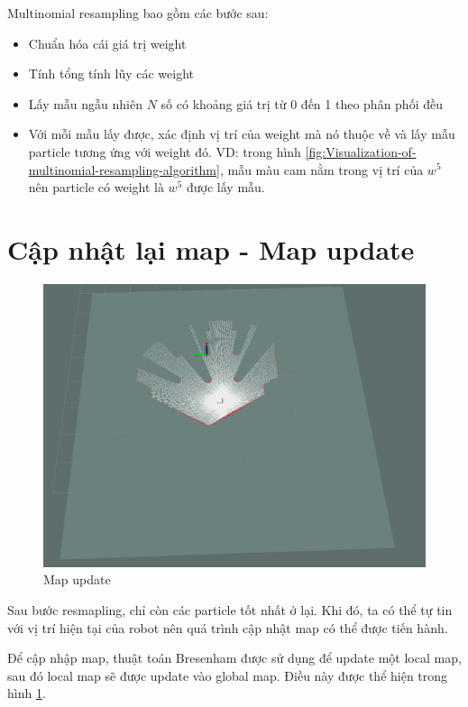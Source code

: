 \documentclass[../../main.tex]{subfiles}
\begin{document}
Multinomial resampling bao gồm các bước sau:
\begin{itemize}
    \item Chuẩn hóa cái giá trị weight
    \item Tính tổng tính lũy các weight
    \item Lấy mẫu ngẫu nhiên $N$ số  có khoảng giá trị từ 0 đến 1 theo phân phối đều
    \item Với mỗi mẫu lấy được, xác định vị trí của weight mà nó thuộc về và lấy mẫu particle tương ứng với weight đó. VD: trong hình \ref{fig:Visualization-of-multinomial-resampling-algorithm}, mẫu màu cam nằm trong vị trí của $w^5$ nên particle có weight là $w^5$ được lấy mẫu.
\end{itemize}

\section{Cập nhật lại map - Map update}

\begin{figure}[H]
    \begin{center}
        \includegraphics[scale=0.3]{map_update.png}
    \end{center}
    \caption{Map update}
    \label{fig:map_update}
\end{figure}

Sau bước resmapling, chỉ còn các particle tốt nhất ở lại. Khi đó, ta có thể tự tin với vị trí hiện tại của robot nên quá trình cập nhật map có thể được tiến hành.

Để cập nhập map, thuật toán Bresenham được sử dụng để update một local map, sau đó local map sẽ được update vào global map. Điều này được thể hiện trong hình \ref{fig:map_update}.
\end{document}
